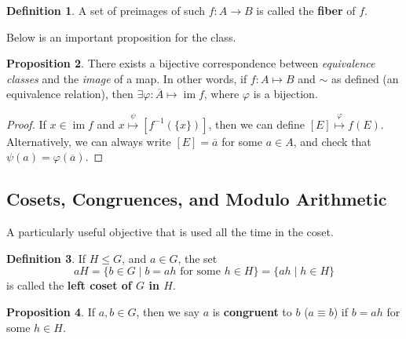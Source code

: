 \documentclass[11pt]{amsart} %
\theoremstyle{definition}
\newtheorem{definition}{Definition}[section]
\newtheorem{proposition}[definition]{Proposition}
\theoremstyle{definition}
\DeclareMathOperator{\im}{im}
\numberwithin{equation}{section}
\begin{document}
\begin{definition}
	A set of preimages of such $f: A \to B$ is called the \textbf{fiber} of $f$.
\end{definition}

Below is an important proposition for the class.

\begin{proposition}
	There exists a bijective correspondence between \textit{equivalence classes} and the \textit{image} of a map. In other words, if $f: A \mapsto B$ and $\sim$ as defined (an equivalence relation), then $\exists \varphi : \overline{A} \mapsto \im f$, where $\varphi$ is a bijection.
\end{proposition}

\begin{proof}
	If $x \in \im f $ and $x \overset{\psi}{ \longmapsto  }  [ f^{-1} ( \{x\} ) ] $, then we can define $ [E] \overset{\varphi}{\longmapsto } f(E)  $. Alternatively, we can always write $[E] = \overline{a}$ for some $a \in A$, and check that $\psi (a) = \varphi (\overline{a})$.
\end{proof}

\subsection{Cosets, Congruences, and Modulo Arithmetic}

A particularly useful objective that is used all the time in the coset.

\begin{definition}
	If $H \leq G$, and $a \in G$, the set 
	$$aH = \{ b \in G \mid b = ah \text{ for some } h \in H \} = \{  ah \mid h \in H \} $$
	is called the \textbf{left coset of $G$ in $H$}.
\end{definition}

\begin{proposition}
If $a, b \in G$, then we say $a$ is \textbf{congruent} to $b$ ($a \equiv b$) if $b = ah$ for some $h \in H$.
\end{proposition}
\end{document}
